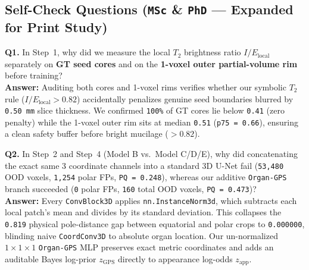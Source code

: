 \documentclass[10pt,a4paper]{article}
\begin{document}
\subsection{Self-Check Questions (\texttt{MSc} \& \texttt{PhD} --- Expanded for Print Study)}

\begin{qabox}
\textbf{Q1.} In Step~1, why did we measure the local $T_2$ brightness ratio $I / E_{\text{local}}$ separately on \textbf{GT seed cores} and on the \textbf{1-voxel outer partial-volume rim} before training?\\[3pt]
\textbf{Answer:} Auditing both cores and 1-voxel rims verifies whether our symbolic $T_2$ rule ($I/E_{\text{local}} > 0.82$) accidentally penalizes genuine seed boundaries blurred by \texttt{0.50\,mm} slice thickness. We confirmed \texttt{100\%} of GT cores lie below \texttt{0.41} (zero penalty) while the 1-voxel outer rim sits at median \texttt{0.51} (\texttt{p75 = 0.66}), ensuring a clean safety buffer before bright mucilage ($>0.82$).
\end{qabox}

\begin{qabox}
\textbf{Q2.} In Step~2 and Step~4 (Model B vs.\ Model C/D/E), why did concatenating the exact same 3 coordinate channels into a standard 3D U-Net fail (\texttt{53,480} OOD voxels, \texttt{1,254} polar FPs, \texttt{PQ = 0.248}), whereas our additive \texttt{Organ-GPS} branch succeeded (\texttt{0} polar FPs, \texttt{160} total OOD voxels, \texttt{PQ = 0.473})?\\[3pt]
\textbf{Answer:} Every \texttt{ConvBlock3D} applies \texttt{nn.InstanceNorm3d}, which subtracts each local patch's mean and divides by its standard deviation. This collapses the \texttt{0.819} physical pole-distance gap between equatorial and polar crops to \texttt{0.000000}, blinding naive \texttt{CoordConv3D} to absolute organ location. Our un-normalized $1\times 1\times 1$ \texttt{Organ-GPS} MLP preserves exact metric coordinates and adds an auditable Bayes log-prior $z_{\text{GPS}}$ directly to appearance log-odds $z_{\text{app}}$.
\end{qabox}
\end{document}
